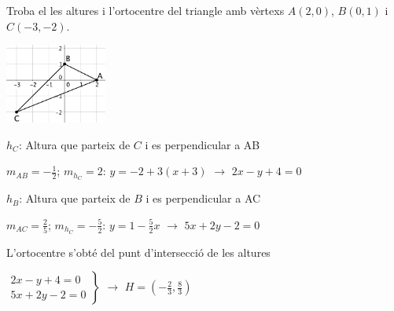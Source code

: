 \begin{resolt}[E]{Troba el les altures i l'ortocentre del triangle amb vèrtexs $A(2,0)$, $B(0,1)$ i $C(-3,-2)$.
	
\begin{center}	
\includegraphics[width=0.25\textwidth]{img-09/triangle-ortocentre}
\end{center}
}
	
	$h_C$: Altura que parteix de $C$ i es perpendicular a AB \vspace{0.25cm}
	
	$m_{AB}=-\frac{1}{2}$; \; $m_{h_C}=2$:\; $y=-2+3(x+3)$ \; $\rightarrow$\;  $2x-y+4=0$\vspace{0.35cm}


	
	$h_B$: Altura que parteix de $B$ i es perpendicular a AC\vspace{0.25cm}

	$m_{AC}=\frac{2}{5}$; \; $m_{h_C}=-\frac{5}{2}$:\; $y=1-\frac{5}{2}x$ \; $\rightarrow$\;  $5x+2y-2=0$\vspace{0.35cm}

	L'ortocentre s'obté del punt d'intersecció de les altures\vspace{0.25cm}
	
	$\left. \begin{array}{l} 2x-y+4=0 \\  5x+2y-2=0 \end{array} \right\}$ \;  $\rightarrow$ \; $\boxed{H=\left(-\frac{2}{3}, \frac{8}{3}\right)}$\vspace{0.25cm}

\end{resolt}

\vspace*{\fill}

